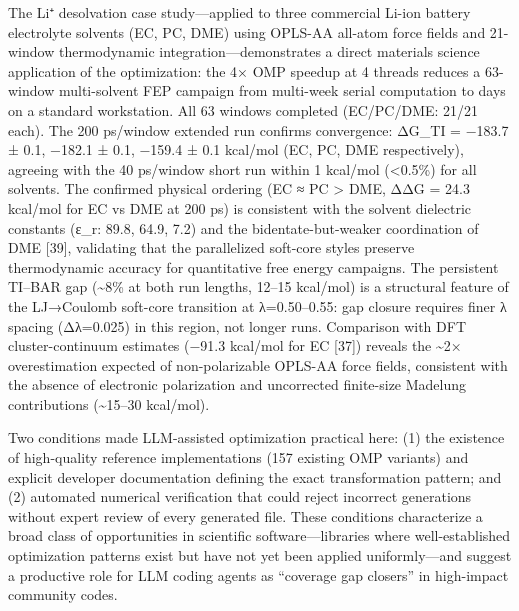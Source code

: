 \documentclass[
  11pt,
]{article}
\begin{document}
The Li⁺ desolvation case study---applied to three commercial Li-ion
battery electrolyte solvents (EC, PC, DME) using OPLS-AA all-atom force
fields and 21-window thermodynamic integration---demonstrates a direct
materials science application of the optimization: the 4× OMP speedup at
4 threads reduces a 63-window multi-solvent FEP campaign from multi-week
serial computation to days on a standard workstation. All 63 windows
completed (EC/PC/DME: 21/21 each). The 200 ps/window extended run
confirms convergence: ΔG\_TI = −183.7 ± 0.1, −182.1 ± 0.1, −159.4 ± 0.1
kcal/mol (EC, PC, DME respectively), agreeing with the 40 ps/window
short run within 1 kcal/mol (\textless0.5\%) for all solvents. The
confirmed physical ordering (EC ≈ PC \textgreater{} DME, ΔΔG = 24.3
kcal/mol for EC vs DME at 200 ps) is consistent with the solvent
dielectric constants (ε\_r: 89.8, 64.9, 7.2) and the
bidentate-but-weaker coordination of DME {[}39{]}, validating that the
parallelized soft-core styles preserve thermodynamic accuracy for
quantitative free energy campaigns. The persistent TI--BAR gap
(\textasciitilde8\% at both run lengths, 12--15 kcal/mol) is a
structural feature of the LJ→Coulomb soft-core transition at
λ=0.50--0.55: gap closure requires finer λ spacing (Δλ=0.025) in this
region, not longer runs. Comparison with DFT cluster-continuum estimates
(−91.3 kcal/mol for EC {[}37{]}) reveals the \textasciitilde2×
overestimation expected of non-polarizable OPLS-AA force fields,
consistent with the absence of electronic polarization and uncorrected
finite-size Madelung contributions (\textasciitilde15--30 kcal/mol).

Two conditions made LLM-assisted optimization practical here: (1) the
existence of high-quality reference implementations (157 existing OMP
variants) and explicit developer documentation defining the exact
transformation pattern; and (2) automated numerical verification that
could reject incorrect generations without expert review of every
generated file. These conditions characterize a broad class of
opportunities in scientific software---libraries where well-established
optimization patterns exist but have not yet been applied
uniformly---and suggest a productive role for LLM coding agents as
``coverage gap closers'' in high-impact community codes.
\end{document}

